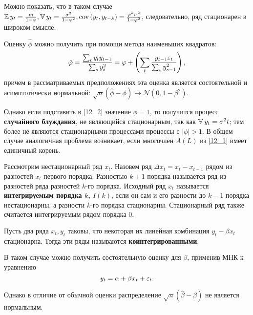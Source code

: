 Можно показать, что в таком случае $\operatorname{\mathbb{E}} y_t = \frac{m}{1-\varphi}, \operatorname{\mathbb{V}} y_t = \frac{\sigma^2}{1-\varphi^2}, \operatorname{cov}\left( y_t, y_{t-k} \right) = \frac{\varphi^k \sigma^2}{1 - \varphi^2}$, следовательно, ряд стационарен в широком смысле.

Оценку $\hat\phi$ можно получить при помощи метода наименьших квадратов:
\begin{equation*}
    \hat{\varphi} = \frac{\sum_{t} y_{t}y_{t-1}}{\sum_s y_s^2} = \varphi + \left( \sum_t \frac{y_{t-1} \varepsilon_t}{\sum_s y_{s-1}^2} \right),
\end{equation*}
причем в рассматриваемых предположениях эта оценка является состоятельной и асимптотически нормальной: $\sqrt{n}\left( \hat\phi - \phi \right) \to \mathcal{N}\left( 0, 1-\beta^2 \right)$.

Однако если подставить в \eqref{12_2} значение $\phi = 1$, то получится процесс \textbf{случайного блуждания}, не являющийся стационарным, так как $\operatorname{\mathbb{V}} y_t = \sigma^2 t$; тем более не являются стационарными процессами процессы с $|\phi| > 1$.
В общем случае аналогичная проблема возникает, если многочлен $A(L)$ из \eqref{12_1} имеет единичный корень.


\begin{definition}
    Рассмотрим нестационарный ряд $x_t$.
    Назовем ряд $\Delta x_t = x_t - x_{t-1}$ рядом из разностей $x_t$ первого порядка.
    Разностью $k+1$ порядка называется ряд из разностей ряда разностей $k$-го порядка.
    Исходный ряд $x_t$ называется \textbf{интегрируемым порядка $k$, $I(k)$}, если он сам и его разности до $k-1$ порядка нестационарны, а разности $k$-го порядка стационарны.
    Стационарный ряд также считается интегрируемым рядом порядка $0$.
\end{definition}

\begin{definition}[Коинтеграция]
    Пусть два ряда $x_t, y_t$ таковы, что некоторая их линейная комбинация $y_t - \beta x_t$ стационарна.
    Тогда эти ряды называются \textbf{коинтегрированными}.
\end{definition}

В таком случае можно получить состоятельную оценку для $\beta$, применив МНК к уравнению
\begin{equation*}
    y_t = \alpha + \beta x_t + \varepsilon_t.
\end{equation*}

Однако в отличие от обычной оценки распределение $\sqrt{n} \left( \hat\beta - \beta \right)$ не является нормальным.


